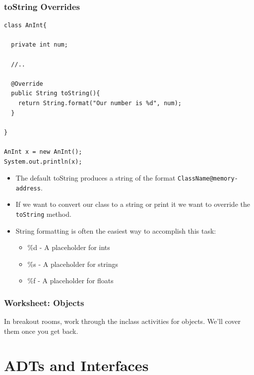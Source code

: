 \documentclass{beamer}
\begin{document}
\begin{frame}[fragile]
    \frametitle{toString Overrides}
    \begin{minipage}{0.49\textwidth}
        \begin{lstlisting}[basicstyle=\tiny, frame=trBL]
class AnInt{
    
  private int num;

  //..

  @Override
  public String toString(){
    return String.format("Our number is %d", num);
  }

}

AnInt x = new AnInt();
System.out.println(x); 
        \end{lstlisting}
    \end{minipage}
    \begin{minipage}{0.49\textwidth}
        \begin{itemize}
            \item The default toString produces a string of the format \lstinline|ClassName@memory-address|.
                \pause
            \item If we want to convert our class to a string or print it we want to override the \lstinline|toString| method.
                \pause
            \item String formatting is often the easiest way to accomplish this task:
                \begin{itemize}
                    \item \%d - A placeholder for ints
                    \item \%s - A placeholder for strings
                    \item \%f - A placeholder for floats
                \end{itemize}
        \end{itemize}
    \end{minipage}
\end{frame}

\begin{frame}
    \frametitle{Worksheet: Objects}
    \vfill
    In breakout rooms, work through the inclass activities for objects. We'll cover them once you get back.
    \vfill
\end{frame}


\section{ADTs and Interfaces}
\end{document}

